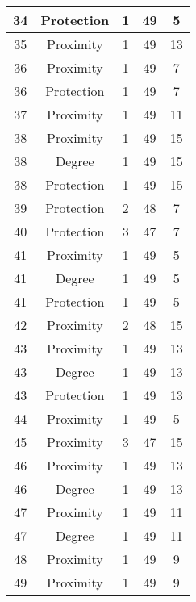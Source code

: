 \documentclass[results.tex]{subfiles}
\begin{document}
\begin{center}
\begin{tabular}{| c || c | c | c | c |}
    \hline
    34 & Protection & 1 & 49 & 5 \\ 
    \hline
    35 & Proximity & 1 & 49 & 13 \\ 
    \hline
    36 & Proximity & 1 & 49 & 7 \\ 
    \hline
    36 & Protection & 1 & 49 & 7 \\ 
    \hline
    37 & Proximity & 1 & 49 & 11 \\ 
    \hline
    38 & Proximity & 1 & 49 & 15 \\ 
    \hline
    38 & Degree & 1 & 49 & 15 \\ 
    \hline
    38 & Protection & 1 & 49 & 15 \\ 
    \hline
    39 & Protection & 2 & 48 & 7 \\ 
    \hline
    40 & Protection & 3 & 47 & 7 \\ 
    \hline
    41 & Proximity & 1 & 49 & 5 \\ 
    \hline
    41 & Degree & 1 & 49 & 5 \\ 
    \hline
    41 & Protection & 1 & 49 & 5 \\ 
    \hline
    42 & Proximity & 2 & 48 & 15 \\ 
    \hline
    43 & Proximity & 1 & 49 & 13 \\ 
    \hline
    43 & Degree & 1 & 49 & 13 \\ 
    \hline
    43 & Protection & 1 & 49 & 13 \\ 
    \hline
    44 & Proximity & 1 & 49 & 5 \\ 
    \hline
    45 & Proximity & 3 & 47 & 15 \\ 
    \hline
    46 & Proximity & 1 & 49 & 13 \\ 
    \hline
    46 & Degree & 1 & 49 & 13 \\ 
    \hline
    47 & Proximity & 1 & 49 & 11 \\ 
    \hline
    47 & Degree & 1 & 49 & 11 \\ 
    \hline
    48 & Proximity & 1 & 49 & 9 \\ 
    \hline
    49 & Proximity & 1 & 49 & 9 \\ 
    \hline   \end{tabular}
\end{center}
\end{document}

